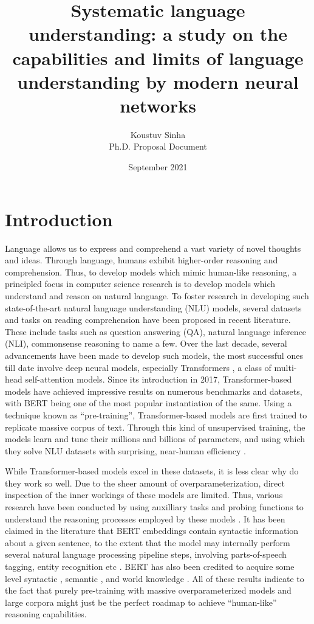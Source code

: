 \documentclass[12pt]{article}
\title{Systematic language understanding: a study on the capabilities and limits of language understanding by modern neural networks}
\author{Koustuv Sinha \\ Ph.D. Proposal Document}
\date{September 2021}
\begin{document}
\maketitle

\section{Introduction}

Language allows us to express and comprehend a vast variety of novel thoughts and ideas. Through language, humans exhibit higher-order reasoning and comprehension. Thus, to develop models which mimic human-like reasoning, a principled focus in computer science research is to develop models which understand and reason on natural language. To foster research in developing such state-of-the-art natural language understanding (NLU) models, several datasets and tasks on reading comprehension have been proposed in recent literature. These include tasks such as question answering (QA), natural language inference (NLI), commonsense reasoning to name a few. Over the last decade, several advancements have been made to develop such models, the most successful ones till date involve deep neural models, especially Transformers \cite{vaswani-etal-2017-attention}, a class of multi-head self-attention models. Since its introduction in 2017, Transformer-based models have achieved impressive results on numerous benchmarks and datasets, with BERT \cite{devlin2018bert} being one of the most popular instantiation of the same. Using a technique known as ``pre-training'', Transformer-based models are first trained to replicate massive corpus of text. Through this kind of unsupervised training, the models learn and tune their millions and billions of parameters, and using which they solve NLU datasets with surprising, near-human efficiency \cite{devlin2018bert,liu-et-al-2019-roberta,lewis-etal-2020-bart}.

While Transformer-based models excel in these datasets, it is less clear why do they work so well. Due to the sheer amount of overparameterization, direct inspection of the inner workings of these models are limited. Thus, various research have been conducted by using auxilliary tasks and probing functions to understand the reasoning processes employed by these models \cite{rogers2020}. It has been claimed in the literature that BERT embeddings contain syntactic information about a given sentence, to the extent that the model may internally perform several natural language processing pipeline steps, involving parts-of-speech tagging, entity recognition etc \CITE. BERT has also been credited to acquire some level syntactic \cite{hewitt-manning-2019-structural,jawahar-etal-2019-bert}, semantic \cite{tenney-etal-2019-bert,ettinger2020}, and world knowledge \cite{petroni2019language, rogers2020}. All of these results indicate to the fact that purely pre-training with massive overparameterized models and large corpora might just be the perfect roadmap to achieve ``human-like'' reasoning capabilities.
\end{document}
